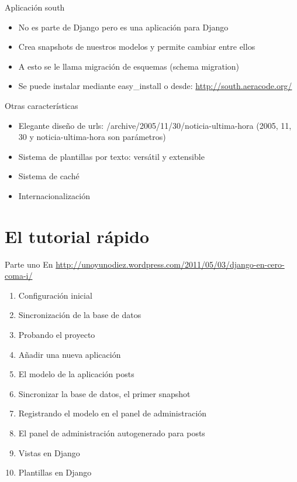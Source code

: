 \documentclass[spanish]{beamer}
\begin{document}
\begin{frame}{Aplicación south}
\begin{itemize}
\item No es parte de Django pero es una aplicación para Django
\item Crea snapshots de nuestros modelos y permite cambiar entre ellos
\item A esto se le llama migración de esquemas (schema migration)
\item Se puede instalar mediante easy\_install o desde: \url{http://south.aeracode.org/}
\end{itemize}
\end{frame}

\begin{frame}{Otras características}
\begin{itemize}
\item Elegante diseño de urls: /archive/2005/11/30/noticia-ultima-hora (2005, 11, 30 y noticia-ultima-hora son parámetros)
\item Sistema de plantillas por texto: versátil y extensible
\item Sistema de caché
\item Internacionalización
\end{itemize}
\end{frame}

\section{El tutorial rápido}
\begin{frame}{Parte uno}
En \url{http://unoyunodiez.wordpress.com/2011/05/03/django-en-cero-coma-i/}
\begin{enumerate}
\item Configuración inicial
\item Sincronización de la base de datos
\item Probando el proyecto
\item Añadir una nueva aplicación
\item El modelo de la aplicación posts
\item Sincronizar la base de datos, el primer snapshot
\item Registrando el modelo en el panel de administración
\item El panel de administración autogenerado para posts
\item Vistas en Django
\item Plantillas en Django
\end{enumerate}
\end{frame}
\end{document}
